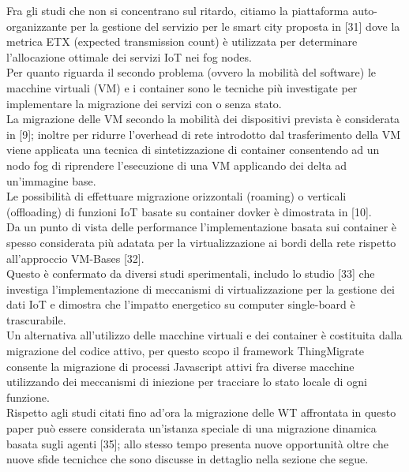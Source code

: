 \documentclass[11pt]{article}
\begin{document}
	Fra gli studi che non si concentrano sul ritardo, citiamo la piattaforma auto-organizzante per la gestione del servizio per le smart city proposta in  [31] dove la metrica ETX (expected transmission count) è utilizzata per determinare l'allocazione ottimale dei servizi IoT nei fog nodes. \\
	Per quanto riguarda il secondo problema (ovvero la mobilità del software) le macchine virtuali (VM) e i container sono le tecniche più investigate per implementare la migrazione dei servizi con o senza stato. \\
	La migrazione delle VM secondo la mobilità dei dispositivi prevista è considerata in [9]; inoltre per ridurre l'overhead di rete introdotto dal trasferimento della VM viene applicata una tecnica di sintetizzazione di container consentendo ad un nodo fog di riprendere l'esecuzione di una VM applicando dei delta ad un'immagine base. \\
	Le possibilità di effettuare migrazione orizzontali (roaming) o verticali (offloading) di funzioni IoT basate su container dovker è dimostrata in [10]. \\
	Da un punto di vista delle performance l'implementazione basata sui container è spesso considerata più adatata per la virtualizzazione ai bordi della rete rispetto all'approccio VM-Bases [32]. \\
	Questo è confermato da diversi studi sperimentali, includo lo studio [33] che investiga l'implementazione di meccanismi di virtualizzazione per la gestione dei dati IoT e dimostra che l'impatto energetico su computer single-board è trascurabile. \\
	Un alternativa all'utilizzo delle macchine virtuali e dei container è costituita dalla migrazione del codice attivo, per questo scopo il framework ThingMigrate consente la migrazione di processi Javascript attivi fra diverse macchine utilizzando dei meccanismi di iniezione per tracciare lo stato locale di ogni funzione. \\
	Rispetto agli studi citati fino ad'ora la migrazione delle WT affrontata in questo paper può essere considerata un'istanza speciale di una migrazione dinamica basata sugli agenti [35]; allo stesso tempo presenta nuove opportunità oltre che nuove sfide tecnichce che sono discusse in dettaglio nella sezione che segue.
	\pagebreak
\end{document}
